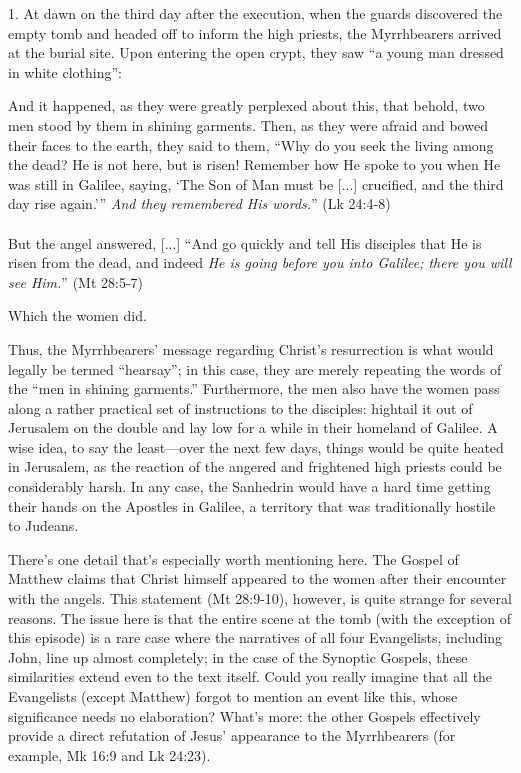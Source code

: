 1. At dawn on the third day after the execution, when the guards discovered the empty tomb and headed off to inform the high priests, the Myrrhbearers arrived at the burial site. Upon entering the open crypt, they saw ``a young man dressed in white clothing'':

\begin{smallquote}
    And it happened, as they were greatly perplexed about this, that behold, two men stood by them in shining garments. Then, as they were afraid and bowed their faces to the earth, they said to them, ``Why do you seek the living among the dead? He is not here, but is risen! Remember how He spoke to you when He was still in Galilee, saying, `The Son of Man must be [...] crucified, and the third day rise again.''' \emph{And they remembered His words.}'' (Lk 24:4-8) \\
    \\
    But the angel answered, [...] ``And go quickly and tell His disciples that He is risen from the dead, and indeed \emph{He is going before you into Galilee; there you will see Him.}'' (Mt 28:5-7)
\end{smallquote}
Which the women did.

Thus, the Myrrhbearers' message regarding Christ's resurrection is what would legally be termed ``hearsay''; in this case, they are merely repeating the words of the ``men in shining garments.'' Furthermore, the men also have the women pass along a rather practical set of instructions to the disciples: hightail it out of Jerusalem on the double and lay low for a while in their homeland of Galilee. A wise idea, to say the least---over the next few days, things would be quite heated in Jerusalem, as the reaction of the angered and frightened high priests could be considerably harsh. In any case, the Sanhedrin would have a hard time getting their hands on the Apostles in Galilee, a territory that was traditionally hostile to Judeans.

There's one detail that's especially worth mentioning here. The Gospel of Matthew claims that Christ himself appeared to the women after their encounter with the angels. This statement (Mt 28:9-10), however, is quite strange for several reasons. The issue here is that the entire scene at the tomb (with the exception of this episode) is a rare case where the narratives of all four Evangelists, including John, line up almost completely; in the case of the Synoptic Gospels, these similarities extend even to the text itself. Could you really imagine that all the Evangelists (except Matthew) forgot to mention an event like this, whose significance needs no elaboration? What's more: the other Gospels effectively provide a direct refutation of Jesus' appearance to the Myrrhbearers (for example, Mk 16:9 and Lk 24:23).

